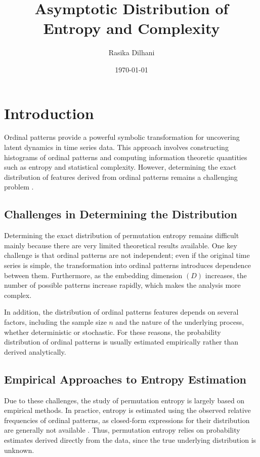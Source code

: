 \documentclass[12pt,a4paper]{article}
\title{Asymptotic Distribution of Entropy and Complexity}
\author{Rasika Dilhani}
\date{\today}
\begin{document}
	
	\maketitle


\section{Introduction}
Ordinal patterns provide a powerful symbolic transformation for uncovering latent dynamics in time series data. This approach involves constructing histograms of ordinal patterns and computing information theoretic quantities such as entropy and statistical complexity. However, determining the exact distribution of features derived from ordinal patterns remains a challenging problem \cite{Chagas2022, Rey2023a, silbernagel2025joint}.

\subsection{Challenges in Determining the Distribution}

Determining the exact distribution of permutation entropy remains difficult mainly because there are very limited theoretical results available. One key challenge is that ordinal patterns are not independent; even if the original time series is simple, the transformation into ordinal patterns introduces dependence between them. Furthermore, as the embedding dimension $(D)$ increases, the number of possible patterns increase rapidly, which makes the analysis more complex. 

In addition, the distribution of ordinal patterns features depends on several factors, including the sample size $n$ and the nature of the underlying process, whether deterministic or stochastic. For these reasons, the probability distribution of ordinal patterns is usually estimated empirically rather than derived analytically. 

\subsection{Empirical Approaches to Entropy Estimation}

Due to these challenges, the study of permutation entropy is largely based on empirical methods. In practice, entropy is estimated using the observed relative frequencies of ordinal patterns, as closed-form expressions for their distribution are generally not available \cite{Bandt2002}. Thus, permutation entropy relies on probability estimates derived directly from the data, since the true underlying distribution is unknown.
\end{document}
